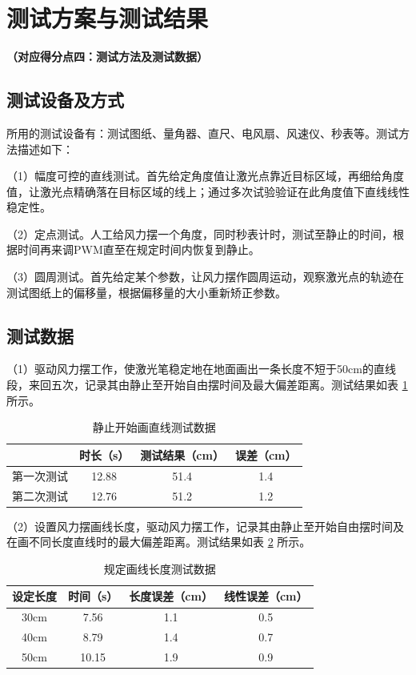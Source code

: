 \documentclass[zihao=-4,fontset=none]{ctexart}
\begin{document}
\section{测试方案与测试结果}
\textbf{（对应得分点四：测试方法及测试数据）}

\subsection{测试设备及方式}

所用的测试设备有：测试图纸、量角器、直尺、电风扇、风速仪、秒表等。测试方法描述如下：

（1）幅度可控的直线测试。首先给定角度值让激光点靠近目标区域，再细给角度值，让激光点精确落在目标区域的线上；通过多次试验验证在此角度值下直线线性稳定性。

（2）定点测试。人工给风力摆一个角度，同时秒表计时，测试至静止的时间，根据时间再来调PWM直至在规定时间内恢复到静止。

（3）圆周测试。首先给定某个参数，让风力摆作圆周运动，观察激光点的轨迹在测试图纸上的偏移量，根据偏移量的大小重新矫正参数。

\subsection{测试数据}

（1）驱动风力摆工作，使激光笔稳定地在地面画出一条长度不短于50cm的直线段，来回五次，记录其由静止至开始自由摆时间及最大偏差距离。测试结果如表 \ref{tab:line1} 所示。

\begin{table}[H]
    \centering
    \caption{静止开始画直线测试数据}
    \label{tab:line1}
    \begin{tabular}{cccc}
        \toprule
         & 时长（s） & 测试结果（cm） & 误差（cm） \\
        \midrule
        第一次测试 & 12.88 & 51.4 & 1.4 \\
        第二次测试 & 12.76 & 51.2 & 1.2 \\
        \bottomrule
    \end{tabular}
\end{table}

（2）设置风力摆画线长度，驱动风力摆工作，记录其由静止至开始自由摆时间及在画不同长度直线时的最大偏差距离。测试结果如表 \ref{tab:line2} 所示。

\begin{table}[H]
    \centering
    \caption{规定画线长度测试数据}
    \label{tab:line2}
    \begin{tabular}{cccc}
        \toprule
        设定长度 & 时间（s） & 长度误差（cm） & 线性误差（cm） \\
        \midrule
        30cm & 7.56 & 1.1 & 0.5 \\
        40cm & 8.79 & 1.4 & 0.7 \\
        50cm & 10.15 & 1.9 & 0.9 \\
        \bottomrule
    \end{tabular}
\end{table}
\end{document}
